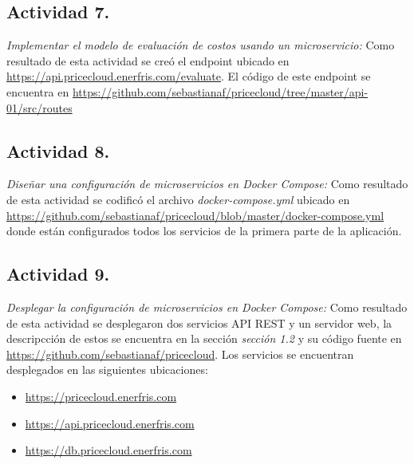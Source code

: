 \subsection{Actividad 7.}
\emph{Implementar el modelo de evaluación de costos usando un microservicio:}\newline\newline
Como resultado de esta actividad se creó el endpoint ubicado en \url{https://api.pricecloud.enerfris.com/evaluate}. El código de este endpoint se encuentra en \url{https://github.com/sebastianaf/pricecloud/tree/master/api-01/src/routes}

\subsection{Actividad 8.}
\emph{Diseñar una configuración de microservicios en \gls{Docker Compose}:}
\newline\newline
Como resultado de esta actividad se codificó el archivo \emph{docker-compose.yml} ubicado en \url{https://github.com/sebastianaf/pricecloud/blob/master/docker-compose.yml} donde están configurados todos los servicios de la primera parte de la aplicación.

\subsection{Actividad 9.}
\emph{Desplegar la configuración de microservicios en \gls{Docker Compose}:}
\newline\newline
Como resultado de esta actividad se desplegaron dos servicios \acrshort{API REST} y un servidor web, la descripcción de estos se encuentra en la sección \emph{sección 1.2} y su código fuente en \url{https://github.com/sebastianaf/pricecloud}.
\newline\newline
Los servicios se encuentran desplegados en las siguientes ubicaciones:
\begin{itemize}
    \item \url{https://pricecloud.enerfris.com}
    \item \url{https://api.pricecloud.enerfris.com}
    \item \url{https://db.pricecloud.enerfris.com}
\end{itemize}


\newpage

